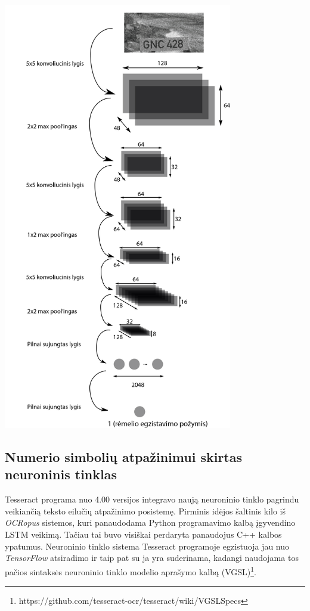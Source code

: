\documentclass{VUMIFInfBakalaurinis}
\begin{document}
\begin{minipage}{\linewidth}
  \includegraphics[width=10cm]{topology.png}
  \label{fig:test}
\end{minipage}

\subsection{Numerio simbolių atpažinimui skirtas neuroninis tinklas}
Tesseract programa nuo 4.00 versijos integravo naują neuroninio tinklo pagrindu veikiančią teksto eilučių atpažinimo posistemę.
Pirminis idėjos šaltinis kilo iš \textit{OCRopus} sistemos, kuri panaudodama Python programavimo kalbą įgyvendino LSTM veikimą.
Tačiau tai buvo visiškai perdaryta panaudojus C++ kalbos ypatumus.
Neuroninio tinklo sistema Tesseract programoje egzistuoja jau nuo \textit{TensorFlow} atsiradimo ir taip pat su ja yra suderinama,
kadangi naudojama tos pačios sintaksės neuroninio tinklo modelio aprašymo kalbą (VGSL)\footnote{https://github.com/tesseract-ocr/tesseract/wiki/VGSLSpecs}.
\end{document}
